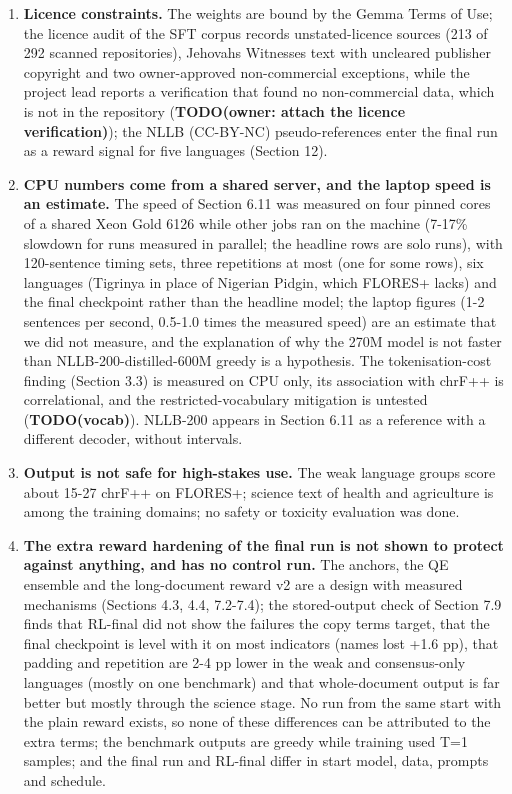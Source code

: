 \begin{enumerate}
\item
  \textbf{Licence constraints.} The weights are bound by the Gemma Terms of Use; the licence audit of the SFT corpus records unstated-licence sources (213 of 292 scanned repositories), Jehovah\textquotesingle s Witnesses text with uncleared publisher copyright and two owner-approved non-commercial exceptions, while the project lead reports a verification that found no non-commercial data, which is not in the repository ({\color{red}\textbf{TODO(owner: attach the licence verification)}}); the NLLB (CC-BY-NC) pseudo-references enter the final run as a reward signal for five languages (Section 12).
\item
  \textbf{CPU numbers come from a shared server, and the laptop speed is an estimate.} The speed of Section 6.11 was measured on four pinned cores of a shared Xeon Gold 6126 while other jobs ran on the machine (7-17\% slowdown for runs measured in parallel; the headline rows are solo runs), with 120-sentence timing sets, three repetitions at most (one for some rows), six languages (Tigrinya in place of Nigerian Pidgin, which FLORES+ lacks) and the final checkpoint rather than the headline model; the laptop figures (1-2 sentences per second, 0.5-1.0 times the measured speed) are an estimate that we did not measure, and the explanation of why the 270M model is not faster than NLLB-200-distilled-600M greedy is a hypothesis. The tokenisation-cost finding (Section 3.3) is measured on CPU only, its association with chrF++ is correlational, and the restricted-vocabulary mitigation is untested ({\color{red}\textbf{TODO(vocab)}}). NLLB-200 appears in Section 6.11 as a reference with a different decoder, without intervals.
\item
  \textbf{Output is not safe for high-stakes use.} The weak language groups score about 15-27 chrF++ on FLORES+; science text of health and agriculture is among the training domains; no safety or toxicity evaluation was done.
\item
  \textbf{The extra reward hardening of the final run is not shown to protect against anything, and has no control run.} The anchors, the QE ensemble and the long-document reward v2 are a design with measured mechanisms (Sections 4.3, 4.4, 7.2-7.4); the stored-output check of Section 7.9 finds that RL-final did not show the failures the copy terms target, that the final checkpoint is level with it on most indicators (names lost +1.6 pp), that padding and repetition are 2-4 pp lower in the weak and consensus-only languages (mostly on one benchmark) and that whole-document output is far better but mostly through the science stage. No run from the same start with the plain reward exists, so none of these differences can be attributed to the extra terms; the benchmark outputs are greedy while training used T=1 samples; and the final run and RL-final differ in start model, data, prompts and schedule.

\end{enumerate}
